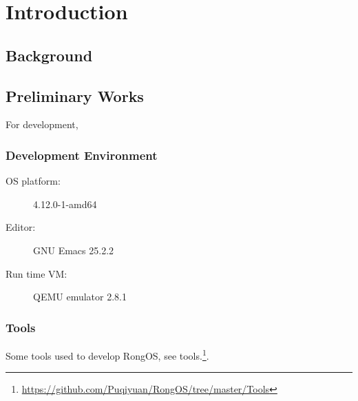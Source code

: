 \documentclass{swfcthesisp}
\begin{document}
\makepreliminarypages%
\frontmatter          
\tableofcontents     %
\listoffigures       %
\listoftables        %
\mainmatter
\chapter{Introduction}

\section{Background}
\label{sec:background}


\section{Preliminary Works}
For development, 

\subsection{Development Environment}
\label{sec:devel-envir}


\begin{description}
\item[OS platform:] 4.12.0-1-amd64
\item [Editor:] GNU Emacs 25.2.2
\item [Run time VM:] QEMU emulator 2.8.1

\end{description}

\subsection{Tools}
\label{sec:tools}

Some tools used to develop RongOS, see
tools.\footnote{\url{https://github.com/Puqiyuan/RongOS/tree/master/Tools}}.
\end{document}
